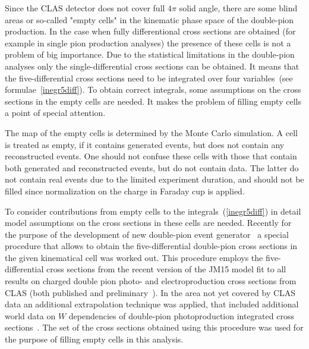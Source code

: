 \begin{figure}[htp]
\begin{center}
\end{center}
\end{figure}

Since the CLAS detector does not cover full $4\pi$ solid angle, there are some blind areas or so-called "empty cells" in the kinematic phase space of the double-pion production. 
In the case when fully differentional cross sections are obtained (for example in single pion production analyses) the presence of these cells is not a problem of big importance. 
Due to the statistical limitations in the double-pion analyses only the single-differential cross sections can be obtained. It means that the five-differential cross sections need to be integrated over four variables~(see formulae~\ref{inegr5diff}). To obtain correct integrals, some assumptions on the cross sections in the empty cells are needed. It makes the problem of filling  empty cells a point of special attention.


The map of the empty cells is determined by the Monte Carlo simulation. A cell is treated as empty, if it contains generated events, but does not contain any reconstructed events. One should not confuse these cells with those that contain both generated and reconstructed events, but do not contain data. The latter do not contain real events due to the limited experiment duration, and should not be filled since normalization on the charge in Faraday cup is applied.

To consider contributions from empty cells to the integrals~(\ref{inegr5diff})  in detail model assumptions on the cross sections in these cells are needed. Recently for the purpose of the development of new double-pion event generator~\cite{Skorodum:EG} a special procedure that allows to obtain the five-differential double-pion cross sections in the given kinematical cell was worked out. This procedure employs the five-differential cross sections from the recent version of the JM15 model fit to all results on charged double pion photo- and electroproduction cross sections from  CLAS (both published and preliminary~\cite{Ripani:2002ss,Mokeev:2012vsa,Fedotov:2008aa,Golovach:note}). 
In the area not yet covered by CLAS data an additional extrapolation technique was applied, that included additional world data on $W$ dependencies of double-pion photoproduction integrated cross sections~\cite{Wu:2005wf,ABBHHM:1968aa}.
The set of the cross sections obtained using this procedure was used for the purpose of filling empty cells in this analysis.





